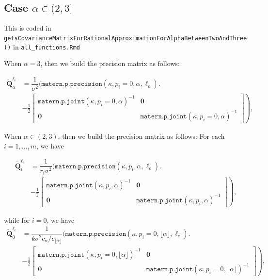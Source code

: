 \documentclass[11pt,a4paper]{article}
\theoremstyle{plain}
\theoremstyle{definition}
\begin{document}
\subsection{Case $\alpha\in(2,3]$}

This is coded in \texttt{getsCovarianceMatrixForRationalApproximationForAlphaBetweenTwoAndThree()} in \texttt{all\_functions.Rmd}

When $\alpha=3$, then we build the precision matrix as follows:

\begin{align}
	\widetilde{\mathbf{Q}}_\alpha^{\ell_e}  &=\dfrac{1}{\sigma^2}\bigg(\texttt{matern.p.precision}(\kappa,p_i=0,\alpha, \ell_e)\bigg.\\& - \left.\frac{1}{2}\begin{bmatrix}
       \texttt{matern.p.joint}(\kappa,p_i=0,\alpha)^{-1} & \mathbf{0} \\
        \mathbf{0} & \texttt{matern.p.joint}(\kappa,p_i=0,\alpha)^{-1}
    \end{bmatrix}\right),
\end{align}

When $\alpha\in(2,3)$, then we build the precision matrix as follows: For each $i=1,\ldots,m$, we have

\begin{align}
	\widetilde{\mathbf{Q}}_i^{\ell_e} & =\dfrac{1}{r_i\sigma^2}\bigg(\texttt{matern.p.precision}(\kappa,p_i,\alpha, \ell_e)\bigg.\\& - \left.\frac{1}{2}\begin{bmatrix}
       \texttt{matern.p.joint}(\kappa,p_i,\alpha)^{-1} & \mathbf{0} \\
        \mathbf{0} & \texttt{matern.p.joint}(\kappa,p_i,\alpha)^{-1}
    \end{bmatrix}\right),
\end{align}

while for $i=0$, we have    
\begin{align}
	\widetilde{\mathbf{Q}}_0^{\ell_e}  &=\dfrac{1}{k\sigma^2c_\alpha/c_{\lfloor\alpha\rfloor}}\bigg(\texttt{matern.p.precision}(\kappa,p_i=0,\lfloor\alpha\rfloor, \ell_e)\bigg.\\& - \left.\frac{1}{2}\begin{bmatrix}
       \texttt{matern.p.joint}(\kappa,p_i=0,\lfloor\alpha\rfloor)^{-1} & \mathbf{0} \\
        \mathbf{0} & \texttt{matern.p.joint}(\kappa,p_i=0,\lfloor\alpha\rfloor)^{-1}
    \end{bmatrix}\right),
\end{align}
\end{document}
